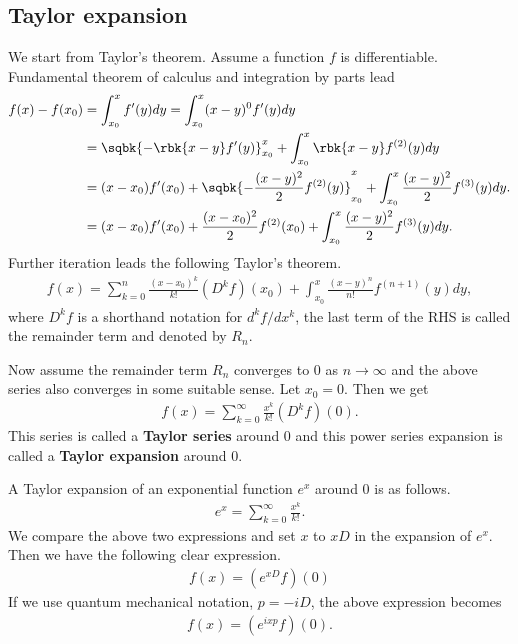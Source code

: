 \documentclass[openany, a4paper, oneside]{jsbook}
\begin{document}
\subsection{Taylor expansion}

We start from Taylor's theorem.
Assume a function $f$ is differentiable.
Fundamental theorem of calculus and integration by parts lead
\begin{align}
 f(x) - f(x_0)
 &=
 \int_{x_0}^{x} f'(y) dy
 =
 \int_{x_0}^x (x - y)^{0} f'(y) dy \\
 &=
 \sqbk{- \rbk{x - y} f'(y)}_{x_0}^x + \int_{x_0}^x \rbk{x - y} f^{(2)} (y) dy \\
 &=
 (x - x_0) f'(x_0) + \sqbk{- \frac{(x-y)^2}{2} f^{(2)}(y)}_{x_0}^x + \int_{x_0}^x \frac{(x - y)^2}{2} f^{(3)} (y)dy. \\
 &=
 (x - x_0) f'(x_0) + \frac{(x-x_0)^2}{2} f^{(2)}(x_0) + \int_{x_0}^x \frac{(x - y)^2}{2} f^{(3)} (y)dy.
\end{align}
Further iteration leads the following Taylor's theorem.
\begin{align}
 f(x)
 =
 \sum_{k=0}^{n} \frac{(x - x_0)^k}{k!} \left( D^k f \right) (x_0) +
  \int_{x_0}^{x} \frac{(x - y)^{n}}{n!} f^{(n+1)} (y) dy,
\end{align}
where $D^k f$ is a shorthand notation for  $d^k f/ dx^k$,
the last term of the RHS is called the remainder term
and denoted by $R_n$.

Now assume the remainder term $R_n$ converges to 0 as $n \to \infty$
and the above series also converges in some suitable sense.
Let $x_0 = 0$.
Then we get
\begin{align}
 f(x)
 =
 \sum_{k=0}^{\infty} \frac{x^k}{k!} \left( D^k f \right) (0).
\end{align}
This series is called a \textbf{Taylor series} around 0 and
this power series expansion is called a \textbf{Taylor expansion} around 0.

A Taylor expansion of an exponential function $e^x$ around $0$ is as follows.
\begin{align}
 e^{x}
 =
 \sum_{k=0}^{\infty} \frac{x^k}{k!}.
\end{align}
We compare the above two expressions and
set $x$ to $x D$ in the expansion of $e^x$.
Then we have the following clear expression.
\begin{align}
 f(x)
 =
 \left( e^{xD} f \right) (0)
\end{align}
If we use quantum mechanical notation, $p = -i D$, the above expression becomes
\begin{align}
 f(x)
 =
 \left( e^{ixp} f \right) (0).
\end{align}
\end{document}
